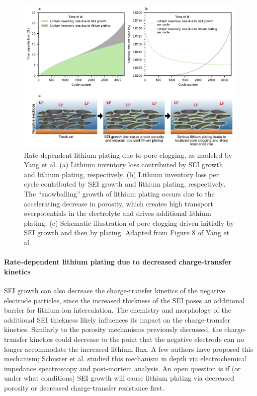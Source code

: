 \documentclass[journal=jpclcd,manuscript=article]{achemso}
\begin{document}
\begin{figure}[hp]
    \centering
    \includegraphics[scale=1]{final_figures/yang_remade.pdf}
    \caption{Rate-dependent lithium plating due to pore clogging, as modeled by Yang et al.\cite{yang_modeling_2017} (a) Lithium inventory loss contributed by SEI growth and lithium plating, respectively. (b) Lithium inventory loss per cycle contributed by SEI growth and lithium plating, respectively. The ``snowballing'' growth of lithium plating occurs due to the accelerating decrease in porosity, which creates high transport overpotentials in the electrolyte and drives additional lithium plating. (c) Schematic illustration of pore clogging driven initially by SEI growth and then by plating. Adapted from Figure 8 of Yang et al.\cite{yang_modeling_2017}}
    \label{fig:pore_clogging}
\end{figure}

\paragraph{Rate-dependent lithium plating due to decreased charge-transfer kinetics}
SEI growth can also decrease the charge-transfer kinetics of the negative electrode particles, since the increased thickness of the SEI poses an additional barrier for lithium-ion intercalation.\cite{xu_differentiating_2010, pinson_theory_2013, li_li-desolvation_2017}
The chemistry and morphology of the additional SEI thickness likely influences its impact on the charge-transfer kinetics.\cite{lu_lithium_2011, xu_electrolytes_2014}
Similarly to the porosity mechanisms previously discussed, the charge-transfer kinetics could decrease to the point that the negative electrode can no longer accommodate the increased lithium flux.
A few authors have proposed this mechanism\cite{klett_non-uniform_2014, ecker_calendar_2014}{}; Schuster et al.\cite{schuster_nonlinear_2015} studied this mechanism in depth via electrochemical impedance spectroscopy and post-mortem analysis.
An open question is if (or under what conditions) SEI growth will cause lithium plating via decreased porosity or decreased charge-transfer resistance first.
\end{document}

